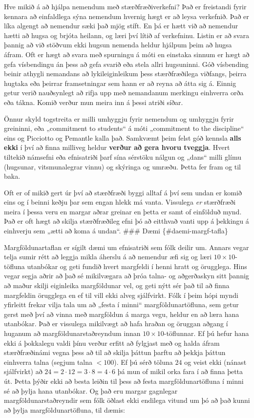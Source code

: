 \documentclass[
  icelandic,
]{book}
\theoremstyle{definition}
\theoremstyle{definition}
\theoremstyle{definition}
\theoremstyle{definition}
\theoremstyle{remark}
\begin{document}
Hve mikið á að hjálpa nemendum með stærðfræðiverkefni? Það er freistandi fyrir kennara að einfaldlega sýna nemendum hvernig hægt er að leysa verkefnið. Það er líka algengt að nemendur sæki það mjög stíft. En þá er hætt við að nemendur hætti að hugsa og brjóta heilann, og læri því lítið af verkefninu. Listin er að svara þannig að við stöðvum ekki hugsun nemenda heldur hjálpum þeim að hugsa áfram. Oft er hægt að svara með spurningu á móti en einstaka sinnum er hægt að gefa vísbendingu án þess að gefa svarið eða stela allri hugsuninni. Góð vísbending beinir athygli nemandans að lykileiginleikum þess stærðfræðilega viðfangs, þeirra hugtaka eða þeirrar framsetningar sem hann er að reyna að átta sig á. Einnig getur verið nauðsynlegt að rifja upp með nemandanum merkingu einhverra orða eða tákna. Komið verður mun meira inn á þessi atriði síðar.

Önnur skyld togstreita er milli umhyggju fyrir nemendum og umhyggju fyrir greininni, eða „commitment to students`` á móti „commitment to the discipline`` eins og Picciotto og Pemantle kalla það. Samkvæmt þeim felst góð kennsla \textbf{alls ekki} í því að finna milliveg heldur \textbf{verður að gera hvoru tveggja}. Hvert tiltekið námsefni eða efnisatriði þarf sína sérstöku nálgun og „dans`` milli glímu (hugsunar, vitsmunalegrar vinnu) og skýringa og umræðu. Þetta fer fram og til baka.

Oft er of mikið gert úr því að stærðfræði byggi alltaf á því sem undan er komið eins og í beinni keðju þar sem engan hlekk má vanta. Vissulega \emph{er} stærðfræði meira í þessa veru en margar aðrar greinar en þetta er samt of einfölduð mynd. Það er oft hægt að skilja stærðfræðileg efni þó að eitthvað vanti upp á þekkingu á einhverju sem „ætti að koma á undan``.
\#\#\# Dæmi \{\#daemi-margf-tafla\}

Margföldunartaflan er sígilt dæmi um efnisatriði sem fólk deilir um. Annars vegar telja sumir rétt að leggja mikla áherslu á að nemendur æfi sig og læri \(10 \times  10\)-töfluna utanbókar og geti fundið hvert margfeldi í henni hratt og örugglega. Hins vegar segja aðrir að það sé mikilvægara að þróa talna- og aðgerðaskyn sitt þannig að maður skilji eiginleika margföldunar vel, og geti nýtt sér það til að finna margfeldin örugglega en ef til vill ekki alveg sjálfvirkt. Fólk í þeim hópi myndi yfirleitt frekar vilja tala um að „festa í minni`` margföldunartöfluna, sem getur gerst með því að vinna með margföldun á marga vegu, heldur en að læra hana utanbókar. Það er vissulega mikilvægt að hafa hraðan og öruggan aðgang í huganum að margföldunarstaðreyndum innan \(10  \times 10\)-töflunnar. Ef þú hefur hana ekki á þokkalegu valdi þínu verður erfitt að fylgjast með og halda áfram stærðfræðinámi vegna þess að til að skilja þáttun þarftu að þekkja þáttun einhverra talna (segjum talna \(<100\)). Ef þú sérð töluna \(24\) og veist ekki (nánast sjálfvirkt) að \(24 = 2 \cdot 12 = 3 \cdot 8 = 4 \cdot 6\) þá mun of mikil orka fara í að finna þetta út. Þetta þýðir ekki að besta leiðin til þess að festa margföldunartöfluna í minni sé að þylja hana utanbókar. Og það eru margar gagnlegar margföldunarstaðreyndir sem fólk öðlast ekki endilega vitund um þó að það kunni að þylja margföldunartöfluna, til dæmis:
\end{document}
